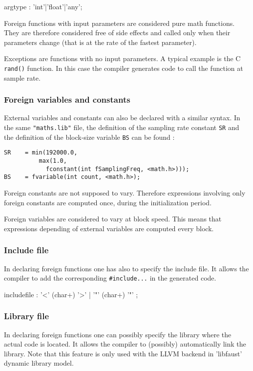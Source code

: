 \begin{rail}
	argtype : 'int'|'float'|'any';
\end{rail}

Foreign functions with input parameters are considered pure math functions. They are therefore considered free of side effects and called only when their parameters change (that is at the rate of the fastest parameter). 

Exceptions are functions with no input parameters. A typical example is the C \lstinline'rand()' function. In this case the compiler generates code to call the function at sample rate.

\subsubsection{Foreign variables and constants} 
External variables and constants can also be declared with a similar syntax. In the same \lstinline'"maths.lib"' file, the definition of the sampling rate constant \lstinline'SR' and the definition of the block-size variable \lstinline'BS' can be found :

\begin{lstlisting}
SR    = min(192000.0, 
	      max(1.0, 
	    	fconstant(int fSamplingFreq, <math.h>)));
BS    = fvariable(int count, <math.h>);
\end{lstlisting}

Foreign constants are not supposed to vary. Therefore expressions involving only foreign constants are computed once, during the initialization period. 

Foreign variables are considered to vary at block speed. This means that expressions depending of external variables are computed every block.

\subsubsection{Include file}
In declaring foreign functions one has also to specify the include file. It allows the \faust compiler to add the corresponding \lstinline'#include...' in the generated code.

\begin{rail}
includefile : '<' (char+) '>' | '"' (char+) '"' ;
\end{rail}

\subsubsection{Library file}
In declaring foreign functions one can possibly specify the library where the actual code is located. It allows the \faust compiler to (possibly) automatically link the library. Note that this feature is only used with the LLVM backend in 'libfaust' dynamic library model.

